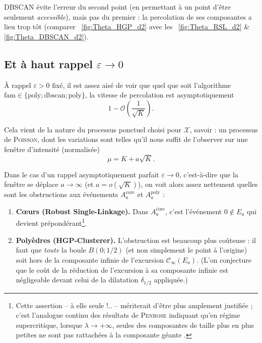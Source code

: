 DBSCAN évite l'erreur du second point (en permettant  à un point d'être seulement \emph{accessible}), mais pas du premier : la percolation de ses composantes a lieu trop tôt (comparer \Fig~\ref{fig:Theta_HGP_d2} avec les \Fig~\ref{fig:Theta_RSL_d2} \& \ref{fig:Theta_DBSCAN_d2}). 



\subsection{Et à haut rappel $\varepsilon \to 0$}

À rappel $\varepsilon > 0$ fixé, il est assez aisé de voir \cite{BibiMenton} que quel que soit l'algorithme $\mathrm{fam} \in \bigl\{ \mathrm{poly} ; \mathrm{dbscan} ; \mathrm{poly} \bigr\}$, la vitesse de percolation est asymptotiquement
\[
1 - \mathcal O\left(\frac{1}{\sqrt K}\right).
\]

Cela vient de la nature du processus ponctuel choisi pour $\mathcal X$, savoir : un processus de \textsc{Poisson}, dont les variations sont telles qu'il nous suffit de l'observer sur une fenêtre d'intensité (normalisée) 
\[
\mu = K + a \sqrt K.
\]


Dans le cas d'un rappel asymptotiquement parfait $\varepsilon \to 0$, c'est-à-dire que la fenêtre se déplace $a \to \infty$ (et $a = o(\sqrt K)$), on voit alors assez nettement quelles sont les obstructions aux événements $A^{\mathrm{core}}_a$ et $A^{\mathrm{poly}}_a$ :
\begin{enumerate}
    \item \textbf{C\oe urs (Robust Single-Linkage).} Dans $\overline{A^{\mathrm{core}}_a}$, c'est l'événement $0 \notin E_a$ qui devient prépondérant\footnote{Cette assertion -- à elle seule !.. -- mériterait d'être plus amplement justifiée ; c'est l'analogue continu des résultats de \textsc{Penrose} indiquant qu'en régime supercritique, lorsque $\lambda \to +\infty$, seules des composantes de taille plus en plus petites ne sont pas rattachées à la composante géante \cite{penrose2003, Penrose2025, PenroseKclusters}.}.
    \item \textbf{Polyèdres (HGP-Clusterer).} L'obstruction est beaucoup plus coûteuse : il faut que \emph{toute} la boule $B(0 ; 1/2)$ (et non simplement le point à l'origine) soit hors de la composante infinie de l'excursion $\mathcal C_\infty \left( E_a\right)$. (L'on conjecture que le coût de la réduction de l'excursion à sa composante infinie est négligeable devant celui de la dilatation $\delta_{1/2}$ appliquée.)
\end{enumerate}

